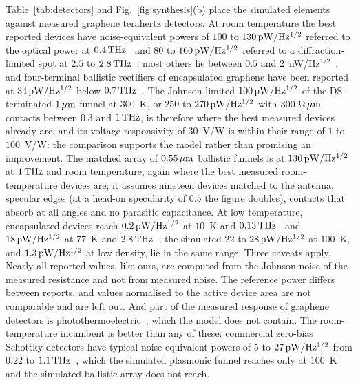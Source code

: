 Table~\ref{tab:detectors} and Fig.~\ref{fig:synthesis}(b) place the
simulated elements against measured graphene terahertz detectors. At room
temperature the best reported devices have noise-equivalent powers of $100$
to $130\,\mathrm{pW/Hz^{1/2}}$ referred to the optical power at
$0.4\,\mathrm{THz}$~\cite{generalov2017graphene,ludwig2024terahertz} and $80$ to
$160\,\mathrm{pW/Hz^{1/2}}$ referred to a diffraction-limited spot at $2.5$ to
$2.8\,\mathrm{THz}$~\cite{castilla2019fast,viti2020hbn}; most others lie between
$0.5$ and
$2$~nW/Hz$^{1/2}$~\cite{spirito2014high,zak2014antenna,bandurin2018dual,tong2015antenna,cai2014sensitive,asgari2021chip},
and four-terminal ballistic
rectifiers of encapsulated graphene have been reported at
$34\,\mathrm{pW/Hz^{1/2}}$ below $0.7\,\mathrm{THz}$~\cite{auton2017terahertz}. The
Johnson-limited $100\,\mathrm{pW/Hz^{1/2}}$ of the DS-terminated $1\,\mu\mathrm{m}$ funnel at $300$~K,
or $250$ to $270\,\mathrm{pW/Hz^{1/2}}$ with $300\ \Omega\,\mu\mathrm{m}$ contacts between $0.3$ and
$1\,\mathrm{THz}$, is therefore where the best
measured devices already are, and its voltage responsivity of $30$~V/W is
within their range of $1$ to $100$~V/W: the comparison supports the model rather than
promising an improvement. The matched array of $0.55\,\mu\mathrm{m}$ ballistic funnels
is at $130\,\mathrm{pW/Hz^{1/2}}$ at $1\,\mathrm{THz}$ and room temperature, again where the best
measured room-temperature devices are; it assumes nineteen devices matched
to the antenna, specular edges (at a head-on specularity of $0.5$ the
figure doubles), contacts that absorb at all angles and no parasitic
capacitance. At low temperature, encapsulated devices reach
$0.2\,\mathrm{pW/Hz^{1/2}}$ at $10$~K and
$0.13\,\mathrm{THz}$~\cite{bandurin2018resonant,gayduchenko2021tunnel} and
$18\,\mathrm{pW/Hz^{1/2}}$ at $77$~K and $2.8\,\mathrm{THz}$~\cite{viti2020hbn}; the simulated $22$
to $28\,\mathrm{pW/Hz^{1/2}}$ at $100$~K, and $1.3\,\mathrm{pW/Hz^{1/2}}$ at low density, lie in the same
range. Three caveats apply. Nearly all reported values, like ours, are
computed from the Johnson noise of the measured resistance and not from
measured noise. The reference power differs between reports, and values normalised to the active device area are not comparable
and are left out. And part of the measured response of graphene detectors
is photothermoelectric~\cite{cai2014sensitive,castilla2019fast,ludwig2024terahertz},
which the model does not contain. The room-temperature incumbent is better
than any of these: commercial zero-bias Schottky detectors have typical
noise-equivalent powers of $5$ to $27\,\mathrm{pW/Hz^{1/2}}$ from $0.22$ to
$1.1\,\mathrm{THz}$~\cite{vdi2026detectors}, which the simulated plasmonic funnel
reaches only at $100$~K and the simulated
ballistic array does not reach.

